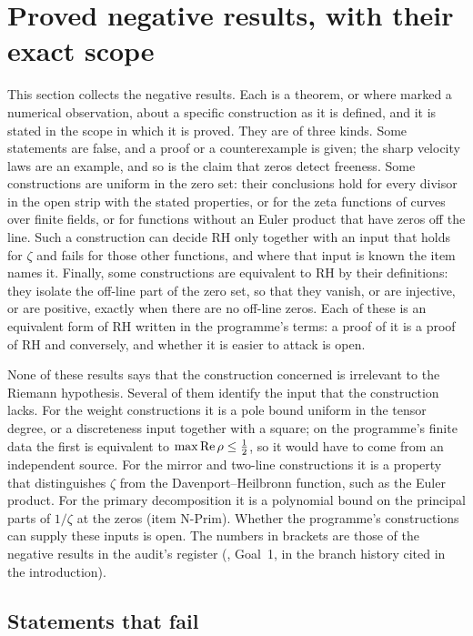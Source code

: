 \section{Proved negative results, with their exact scope}\label{sec:negative}

This section collects the negative results. Each is a theorem, or where marked a numerical observation, about a specific construction as it is defined, and it is stated in the scope in which it is proved.
They are of three kinds.
Some statements are false, and a proof or a counterexample is given; the sharp velocity laws are an example, and so is the claim that zeros detect freeness.
Some constructions are uniform in the zero set: their conclusions hold for every divisor in the open strip with the stated properties, or for the zeta functions of curves over finite fields, or for functions without an Euler product that have zeros off the line. Such a construction can decide RH only together with an input that holds for $\zeta$ and fails for those other functions, and where that input is known the item names it.
Finally, some constructions are equivalent to RH by their definitions: they isolate the off-line part of the zero set, so that they vanish, or are injective, or are positive, exactly when there are no off-line zeros. Each of these is an equivalent form of RH written in the programme's terms: a proof of it is a proof of RH and conversely, and whether it is easier to attack is open.

None of these results says that the construction concerned is irrelevant to the Riemann hypothesis. Several of them identify the input that the construction lacks.
For the weight constructions it is a pole bound uniform in the tensor degree, or a discreteness input together with a square; on the programme's finite data the first is equivalent to $\max\operatorname{Re}\rho\le\tfrac12$, so it would have to come from an independent source.
For the mirror and two-line constructions it is a property that distinguishes $\zeta$ from the Davenport--Heilbronn function, such as the Euler product.
For the primary decomposition it is a polynomial bound on the principal parts of $1/\zeta$ at the zeros (item N-Prim).
Whether the programme's constructions can supply these inputs is open. The numbers in brackets are those of the negative results in the audit's register (, Goal~1, in the branch history cited in the introduction).

\subsection{Statements that fail}

